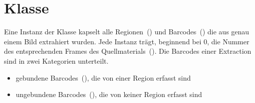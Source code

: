 \section{Klasse }
Eine Instanz der Klasse  kapselt alle Regionen~() und Barcodes~() die aus genau einem Bild extrahiert wurden.
Jede Instanz trägt, beginnend bei 0, die Nummer des entsprechenden Frames des Quellmaterials~().
Die Barcodes einer Extraction sind in zwei Kategorien unterteilt.
\begin{itemize}
  \item gebundene Barcodes~(), die von einer Region erfasst sind
  \item ungebundene Barcodes~(), die von keiner Region erfasst sind
\end{itemize}


